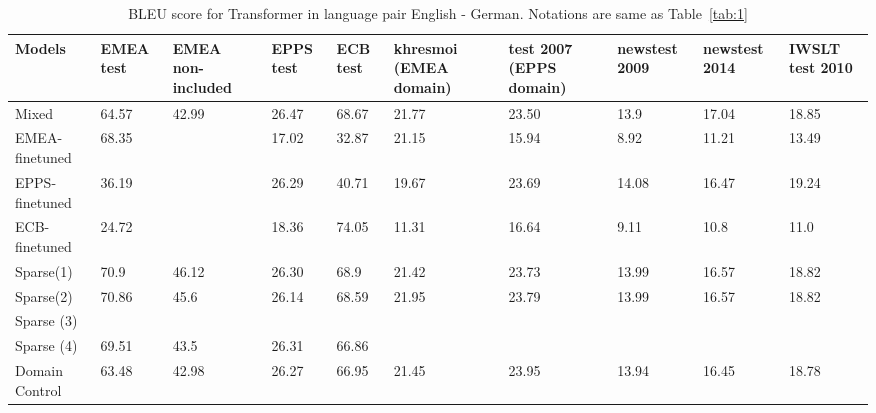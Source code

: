 \documentclass[11pt,a4paper]{article}
\begin{document}
\begin{table}
\begin{center}
 \begin{tabularx}{\textwidth}{|| X | X | X | X | X | X | X | X | X | X ||} 
 \hline
 Models & EMEA test & EMEA non-included & EPPS test & ECB test & khresmoi (EMEA domain) & test 2007 (EPPS domain) & newstest 2009 & newstest 2014 & IWSLT test 2010 \\ [0.5ex] 
 \hline\hline
 Mixed & 64.57 & 42.99 & 26.47 & 68.67 & 21.77 & 23.50 & 13.9 & 17.04 & 18.85 \\
 \hline
 EMEA-finetuned & 68.35 & & 17.02 & 32.87 & 21.15 & 15.94 & 8.92 & 11.21 & 13.49 \\
 \hline
 EPPS-finetuned & 36.19 & & 26.29 & 40.71 & 19.67 & 23.69 & 14.08 & 16.47 & 19.24 \\
 \hline
 ECB-finetuned & 24.72 & & 18.36 & 74.05 & 11.31 & 16.64 & 9.11 & 10.8 & 11.0 \\
 \hline
 Sparse(1) & 70.9 & 46.12 & 26.30 & 68.9 & 21.42 & 23.73 & 13.99 & 16.57 & 18.82 \\
 \hline
 Sparse(2) & 70.86 & 45.6 & 26.14 & 68.59 & 21.95 & 23.79 & 13.99 & 16.57 & 18.82 \\
 \hline
 Sparse (3) &  &  &  &  &  &  &  &  & \\
 \hline
 Sparse (4) & 69.51 & 43.5 & 26.31 & 66.86 &  &  &  &  & \\
 \hline
 Domain Control & 63.48 & 42.98 & 26.27 & 66.95 & 21.45 & 23.95 & 13.94 & 16.45 & 18.78  \\
 \hline
\end{tabularx}
\end{center}
\caption{BLEU score for Transformer in language pair English - German. Notations are same as Table~\ref{tab:1}}
\label{tab:2}
\end{table}
\end{document}
